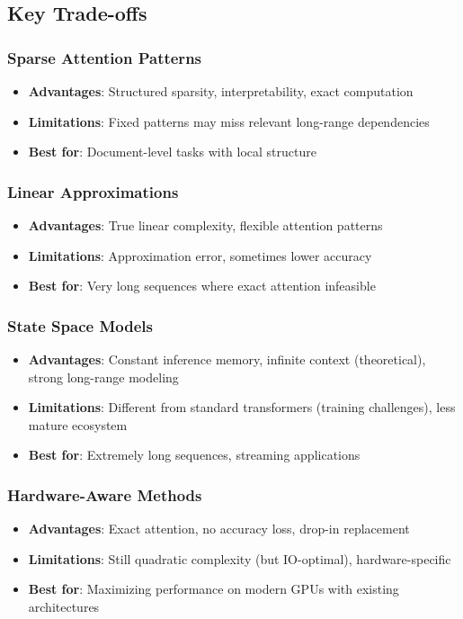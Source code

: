 \documentclass[11pt]{article}
\begin{document}
\subsection{Key Trade-offs}

\subsubsection{Sparse Attention Patterns}
\begin{itemize}[leftmargin=*]
    \item \textbf{Advantages}: Structured sparsity, interpretability, exact computation
    \item \textbf{Limitations}: Fixed patterns may miss relevant long-range dependencies
    \item \textbf{Best for}: Document-level tasks with local structure
\end{itemize}

\subsubsection{Linear Approximations}
\begin{itemize}[leftmargin=*]
    \item \textbf{Advantages}: True linear complexity, flexible attention patterns
    \item \textbf{Limitations}: Approximation error, sometimes lower accuracy
    \item \textbf{Best for}: Very long sequences where exact attention infeasible
\end{itemize}

\subsubsection{State Space Models}
\begin{itemize}[leftmargin=*]
    \item \textbf{Advantages}: Constant inference memory, infinite context (theoretical), strong long-range modeling
    \item \textbf{Limitations}: Different from standard transformers (training challenges), less mature ecosystem
    \item \textbf{Best for}: Extremely long sequences, streaming applications
\end{itemize}

\subsubsection{Hardware-Aware Methods}
\begin{itemize}[leftmargin=*]
    \item \textbf{Advantages}: Exact attention, no accuracy loss, drop-in replacement
    \item \textbf{Limitations}: Still quadratic complexity (but IO-optimal), hardware-specific
    \item \textbf{Best for}: Maximizing performance on modern GPUs with existing architectures
\end{itemize}
\end{document}
